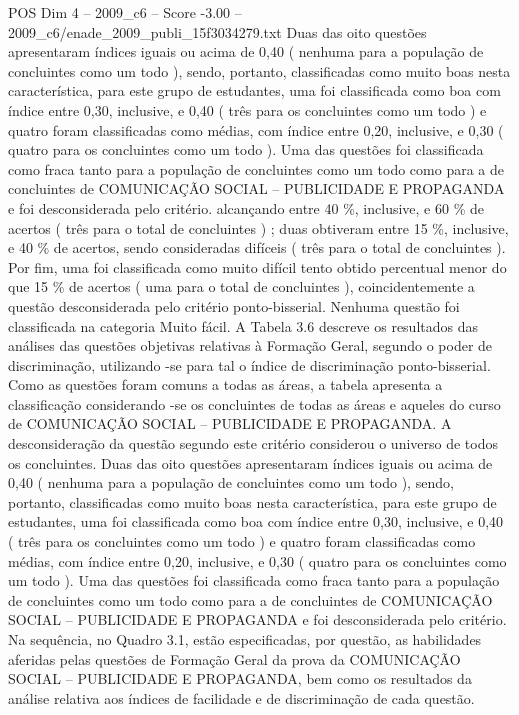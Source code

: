 \begin{textsample}{POS Dim 4 – 2009\_c6 – Score -3.00 – 2009\_c6/enade\_2009\_publi\_15f3034279.txt}
Duas das oito questões apresentaram índices iguais ou acima de 0,40 ( nenhuma para a população de concluintes como um todo ), sendo, portanto, classificadas como muito boas nesta característica, para este grupo de estudantes, uma foi classificada como boa com índice entre 0,30, inclusive, e 0,40 ( três para os concluintes como um todo ) e quatro foram classificadas como médias, com índice entre 0,20, inclusive, e 0,30 ( quatro para os concluintes como um todo ).
Uma das questões foi classificada como fraca tanto para a população de concluintes como um todo como para a de concluintes de COMUNICAÇÃO SOCIAL – PUBLICIDADE E PROPAGANDA e foi desconsiderada pelo critério. alcançando entre 40 \%, inclusive, e 60 \% de acertos ( três para o total de concluintes ) ; duas obtiveram entre 15 \%, inclusive, e 40 \% de acertos, sendo consideradas difíceis ( três para o total de concluintes ).
Por fim, uma foi classificada como muito difícil tento obtido percentual menor do que 15 \% de acertos ( uma para o total de concluintes ), coincidentemente a questão desconsiderada pelo critério ponto-bisserial.
Nenhuma questão foi classificada na categoria Muito fácil.
A Tabela 3.6 descreve os resultados das análises das questões objetivas relativas à Formação Geral, segundo o poder de discriminação, utilizando -se para tal o índice de discriminação ponto-bisserial.
Como as questões foram comuns a todas as áreas, a tabela apresenta a classificação considerando -se os concluintes de todas as áreas e aqueles do curso de COMUNICAÇÃO SOCIAL – PUBLICIDADE E PROPAGANDA.
A desconsideração da questão segundo este critério considerou o universo de todos os concluintes.
Duas das oito questões apresentaram índices iguais ou acima de 0,40 ( nenhuma para a população de concluintes como um todo ), sendo, portanto, classificadas como muito boas nesta característica, para este grupo de estudantes, uma foi classificada como boa com índice entre 0,30, inclusive, e 0,40 ( três para os concluintes como um todo ) e quatro foram classificadas como médias, com índice entre 0,20, inclusive, e 0,30 ( quatro para os concluintes como um todo ).
Uma das questões foi classificada como fraca tanto para a população de concluintes como um todo como para a de concluintes de COMUNICAÇÃO SOCIAL – PUBLICIDADE E PROPAGANDA e foi desconsiderada pelo critério.
Na sequência, no Quadro 3.1, estão especificadas, por questão, as habilidades aferidas pelas questões de Formação Geral da prova da COMUNICAÇÃO SOCIAL – PUBLICIDADE E PROPAGANDA, bem como os resultados da análise relativa aos índices de facilidade e de discriminação de cada questão.

\end{textsample}

